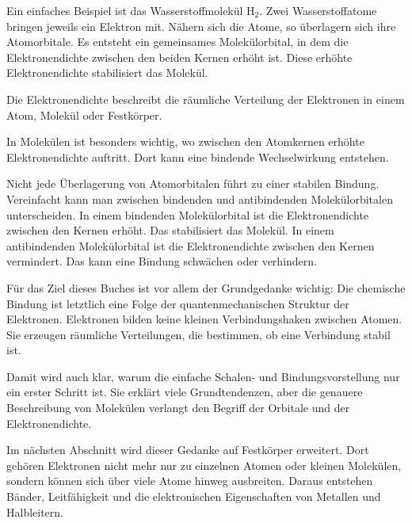 Ein einfaches Beispiel ist das Wasserstoffmolekül \( \mathrm{H_2} \). Zwei
Wasserstoffatome bringen jeweils ein Elektron mit. Nähern sich die Atome, so
überlagern sich ihre Atomorbitale. Es entsteht ein gemeinsames Molekülorbital,
in dem die Elektronendichte zwischen den beiden Kernen erhöht ist. Diese
erhöhte Elektronendichte stabilisiert das Molekül.

\begin{PhysicsBox}[Elektronendichte]
	\label{box:elektronendichte}
	Die Elektronendichte beschreibt die räumliche Verteilung der Elektronen in
	einem Atom, Molekül oder Festkörper.
	
	In Molekülen ist besonders wichtig, wo zwischen den Atomkernen erhöhte
	Elektronendichte auftritt. Dort kann eine bindende Wechselwirkung entstehen.
\end{PhysicsBox}

Nicht jede Überlagerung von Atomorbitalen führt zu einer stabilen Bindung.
Vereinfacht kann man zwischen bindenden und antibindenden Molekülorbitalen
unterscheiden. In einem bindenden Molekülorbital ist die Elektronendichte
zwischen den Kernen erhöht. Das stabilisiert das Molekül. In einem
antibindenden Molekülorbital ist die Elektronendichte zwischen den Kernen
vermindert. Das kann eine Bindung schwächen oder verhindern.

Für das Ziel dieses Buches ist vor allem der Grundgedanke wichtig: Die
chemische Bindung ist letztlich eine Folge der quantenmechanischen Struktur
der Elektronen. Elektronen bilden keine kleinen Verbindungshaken zwischen
Atomen. Sie erzeugen räumliche Verteilungen, die bestimmen, ob eine Verbindung
stabil ist.

Damit wird auch klar, warum die einfache Schalen- und Bindungsvorstellung nur
ein erster Schritt ist. Sie erklärt viele Grundtendenzen, aber die genauere
Beschreibung von Molekülen verlangt den Begriff der Orbitale und der
Elektronendichte.

Im nächsten Abschnitt wird dieser Gedanke auf Festkörper erweitert. Dort
gehören Elektronen nicht mehr nur zu einzelnen Atomen oder kleinen Molekülen,
sondern können sich über viele Atome hinweg ausbreiten. Daraus entstehen
Bänder, Leitfähigkeit und die elektronischen Eigenschaften von Metallen und
Halbleitern.